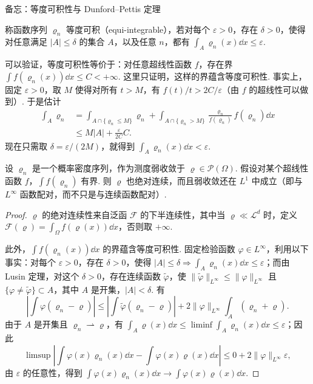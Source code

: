 \begin{sourcebox}{备忘：等度可积性与 Dunford--Pettis 定理}\label{box:8.2}
\begin{definition*}
称函数序列 $\varrho_n$ 等度可积（equi-integrable），若对每个 $\varepsilon>0$，存在 $\delta>0$，使得对任意满足 $|A|\leq\delta$ 的集合 $A$，以及任意 $n$，都有 $\int_A\varrho_n(x)\dd x\leq\varepsilon$.
\end{definition*}
可以验证，等度可积性等价于：对任意超线性函数 $f$，存在界 $\int f(\varrho_n(x))\dd x\leq C<+\infty$. 这里只证明，这样的界蕴含等度可积性. 事实上，固定 $\varepsilon>0$，取 $M$ 使得对所有 $t>M$，有 $f(t)/t>2C/\varepsilon$（由 $f$ 的超线性可以做到）. 于是估计
\[
\begin{aligned}
\int_A\varrho_n
&=\int_{A\cap\{\varrho_n\leq M\}}\varrho_n
+\int_{A\cap\{\varrho_n>M\}}\frac{\varrho_n}{f(\varrho_n)}f(\varrho_n)\dd x\\
&\leq M|A|+\frac\varepsilon{2C}C.
\end{aligned}
\]
现在只需取 $\delta=\varepsilon/(2M)$，就得到 $\int_A\varrho_n(x)\dd x<\varepsilon$.

\begin{theorem*}
设 $\varrho_n$ 是一个概率密度序列，作为测度弱收敛于 $\varrho\in\mathscr P(\Omega)$. 假设对某个超线性函数 $f$，$\int f(\varrho_n)$ 有界. 则 $\varrho$ 也绝对连续，而且弱收敛还在 $L^1$ 中成立（即与 $L^\infty$ 函数配对，而不只是与连续函数配对）.
\end{theorem*}
\begin{proof}
$\varrho$ 的绝对连续性来自泛函 $\mathscr F$ 的下半连续性，其中当 $\varrho\ll\mathscr L^d$ 时，定义 $\mathscr F(\varrho)=\int_\Omega f(\varrho(x))\dd x$，否则取 $+\infty$.

此外，$\int f(\varrho_n(x))\dd x$ 的界蕴含等度可积性. 固定检验函数 $\varphi\in L^\infty$，利用以下事实：对每个 $\varepsilon>0$，存在 $\delta>0$，使得 $|A|\leq\delta\Longrightarrow\int_A\varrho_n(x)\dd x\leq\varepsilon$；而由 Lusin 定理，对这个 $\delta>0$，存在连续函数 $\widetilde\varphi$，使 $\|\widetilde\varphi\|_{L^\infty}\leq\|\varphi\|_{L^\infty}$ 且 $\{\varphi\neq\widetilde\varphi\}\subset A$，其中 $A$ 是开集，$|A|<\delta$. 有
\[
\left|\int\varphi(\varrho_n-\varrho)\right|
\leq\left|\int\widetilde\varphi(\varrho_n-\varrho)\right|
+2\|\varphi\|_{L^\infty}\int_A(\varrho_n+\varrho).
\]
由于 $A$ 是开集且 $\varrho_n\rightharpoonup\varrho$，有 $\int_A\varrho(x)\dd x\leq\liminf\int_A\varrho_n(x)\dd x\leq\varepsilon$；因此
\[
\limsup\left|\int\varphi(x)\varrho_n(x)\dd x-\int\varphi(x)\varrho(x)\dd x\right|
\leq0+2\|\varphi\|_{L^\infty}\varepsilon,
\]
由 $\varepsilon$ 的任意性，得到 $\int\varphi(x)\varrho_n(x)\dd x\to\int\varphi(x)\varrho(x)\dd x$.
\end{proof}
\end{sourcebox}
